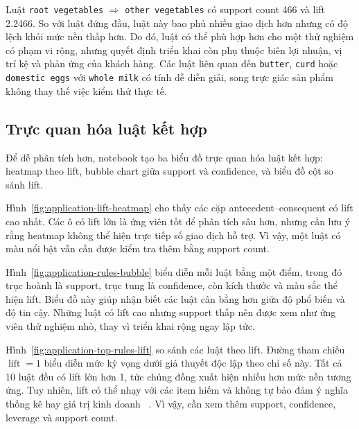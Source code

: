 Luật
\texttt{root vegetables} $\Rightarrow$ \texttt{other vegetables}
có support count 466 và lift 2.2466. So với luật đứng đầu, luật này bao phủ
nhiều giao dịch hơn nhưng có độ lệch khỏi mức nền thấp hơn. Do đó, luật có thể
phù hợp hơn cho một thử nghiệm có phạm vi rộng, nhưng quyết định triển khai còn
phụ thuộc biên lợi nhuận, vị trí kệ và phản ứng của khách hàng. Các luật liên
quan đến \texttt{butter}, \texttt{curd} hoặc \texttt{domestic eggs} với
\texttt{whole milk} có tính dễ diễn giải, song trực giác sản phẩm không thay
thế việc kiểm thử thực tế.

\subsection{Trực quan hóa luật kết hợp}
\label{subsec:application-rule-visualization}

Để dễ phân tích hơn, notebook tạo ba biểu đồ trực quan hóa luật kết hợp: heatmap theo lift, bubble chart giữa support và confidence, và biểu đồ cột so sánh lift.


Hình~\ref{fig:application-lift-heatmap} cho thấy các cặp antecedent--consequent có lift cao nhất. Các ô có lift lớn là ứng viên tốt để phân tích sâu hơn, nhưng cần lưu ý rằng heatmap không thể hiện trực tiếp số giao dịch hỗ trợ. Vì vậy, một luật có màu nổi bật vẫn cần được kiểm tra thêm bằng support count.


Hình~\ref{fig:application-rules-bubble} biểu diễn mỗi luật bằng một điểm, trong đó trục hoành là support, trục tung là confidence, còn kích thước và màu sắc thể hiện lift. Biểu đồ này giúp nhận biết các luật cân bằng hơn giữa độ phổ biến và độ tin cậy. Những luật có lift cao nhưng support thấp nên được xem như ứng viên thử nghiệm nhỏ, thay vì triển khai rộng ngay lập tức.


Hình~\ref{fig:application-top-rules-lift} so sánh các luật theo lift. Đường
tham chiếu $\operatorname{lift}=1$ biểu diễn mức kỳ vọng dưới giả thuyết độc
lập theo chỉ số này. Tất cả 10 luật đều có lift lớn hơn 1, tức chúng đồng xuất
hiện nhiều hơn mức nền tương ứng. Tuy nhiên, lift có thể nhạy với các item hiếm
và không tự bảo đảm ý nghĩa thống kê hay giá trị kinh doanh
~\cite{hahsler2008interest}. Vì vậy, cần xem thêm support, confidence,
leverage và support count.

